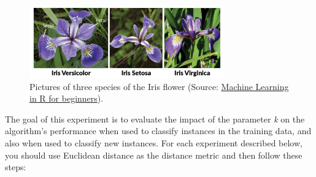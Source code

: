 \documentclass[]{article}
\begin{document}
\begin{enumerate}
    \begin{figure}[h!!!]
        \centering
        \includegraphics[width=0.75\textwidth]{figures/iris-picture.png}
        \caption{Pictures of three species of the Iris flower (Source: \href{https://www.datacamp.com/community/tutorials/machine-learning-in-r}{Machine Learning in R for beginners}).}
        \label{fig:iris}
    \end{figure}
    
    The goal of this experiment is to evaluate the impact of the parameter \textit{k} on the algorithm's performance when used to classify instances in the training data, and also when used to classify new instances. For each experiment described below, you should use Euclidean distance as the distance metric and then follow these steps:
    

\end{enumerate}
\end{document}
